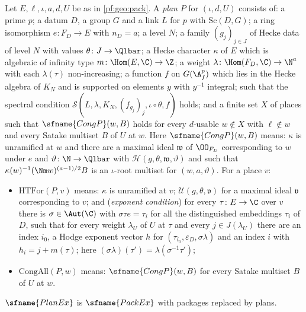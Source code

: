 \begin{definition}[Plans]\label{pf:geo:plan}
Let $E,\ell,\iota,a,d,U$ be as in \cref{pf:geo:pack}. A \emph{plan} $P$ for $(\iota,d,U)$ consists of: a
prime $p$; a datum $D$, a group $G$ and a link $L$ for $p$ with $\mathrm{Sc}(D,G)$; a ring isomorphism
$e\colon F_D\to E$ with $n_D=a$; a level $N$; a family $(g_j)_{j\in J}$ of Hecke data of level $N$ with
values $\theta\colon J\to\Qlbar$; a Hecke character $\kappa$ of $E$ which is algebraic of infinity type
$m\colon\Hom(E,\C)\to\Z$; a weight $\lambda\colon\Hom(F_D,\C)\to\N^{a}$ with each $\lambda(\tau)$
non-increasing; a function $f$ on $G(\A_f^p)$ which lies in the Hecke algebra of $K_N$ and is supported
on elements $y$ with $y^{-1}$ integral; such that the spectral condition
$\mathcal S(L,\lambda,K_N,(f_{g_j})_j,\iota\circ\theta,f)$ holds; and a finite set $X$ of places such that
$\sfname{CongP}(w,B)$ holds for every $d$-usable $w\notin X$ with $\ell\notin w$ and every Satake multiset
$B$ of $U$ at $w$. Here $\sfname{CongP}(w,B)$ means: $\kappa$ is unramified at $w$ and there are a
maximal ideal $\mathfrak w$ of $\OO_{F_D}$ corresponding to $w$ under $e$ and $\vartheta\colon\N\to\Qlbar$ with
$\mathcal H(g,\theta,\mathfrak w,\vartheta)$ and such that $\kappa(w)^{-1}(\Nm w)^{(a-1)/2}B$ is an
$\iota$-root multiset for $(w,a,\vartheta)$. For a place $v$:
\begin{itemize}[nosep]
\item $\mathrm{HTFor}(P,v)$ means: $\kappa$ is unramified at $v$; $\mathcal U(g,\theta,\mathfrak v)$ for a
  maximal ideal $\mathfrak v$ corresponding to $v$; and (\emph{exponent condition}) for every $\tau\colon
  E\to\C$ over $v$ there is $\sigma\in\Aut(\C)$ with $\sigma\tau e=\tau_i$ for all the distinguished embeddings
  $\tau_i$ of $D$, such that for every weight $\lambda_U$ of $U$ at $\tau$ and every $j\in J(\lambda_U)$
  there are an index $i_0$, a Hodge exponent vector $h$ for $(\tau_{i_0},\varepsilon_D,\sigma\lambda)$ and an
  index $i$ with $h_i=j+m(\tau)$; here $(\sigma\lambda)(\tau')=\lambda(\sigma^{-1}\tau')$;
\item $\mathrm{CongAll}(P,w)$ means: $\sfname{CongP}(w,B)$ for every Satake multiset $B$ of $U$ at $w$.
\end{itemize}
$\sfname{PlanEx}$ is $\sfname{PackEx}$ with packages replaced by plans.
\end{definition}

